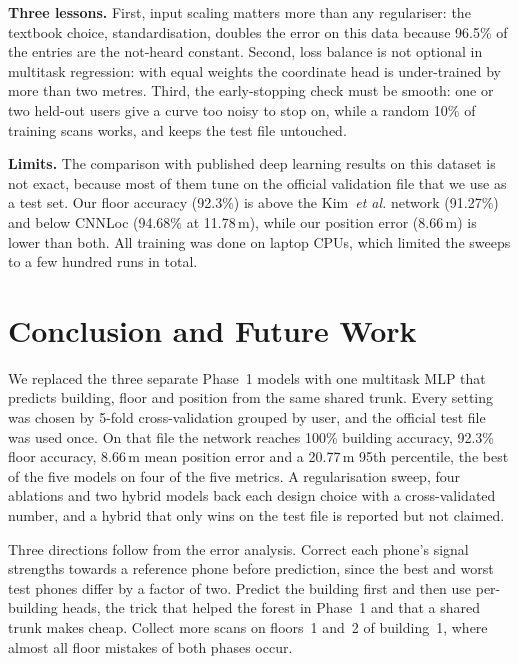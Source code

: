 \documentclass[conference]{IEEEtran}
\begin{document}
\textbf{Three lessons.} First, input scaling matters more than any regulariser: the textbook
choice, standardisation, doubles the error on this data because 96.5\% of the entries are the
not-heard constant. Second, loss balance is not optional in multitask regression: with equal
weights the coordinate head is under-trained by more than two metres. Third, the early-stopping
check must be smooth: one or two held-out users give a curve too noisy to stop on, while a random
10\% of training scans works, and keeps the test file untouched.

\textbf{Limits.} The comparison with published deep learning results on this dataset is not
exact, because most of them tune on the official validation file that we use as a test set. Our
floor accuracy (92.3\%) is above the Kim~\emph{et al.} network (91.27\%) and below CNNLoc
(94.68\% at 11.78\,m), while our position error (8.66\,m) is lower than both. All training was done
on laptop CPUs, which limited the sweeps to a few hundred runs in total.

\section{Conclusion and Future Work}

We replaced the three separate Phase~1 models with one multitask MLP that predicts building, floor
and position from the same shared trunk. Every setting was chosen by 5-fold cross-validation
grouped by user, and the official test file was used once. On that file the network reaches 100\%
building accuracy, 92.3\% floor accuracy, 8.66\,m mean position error and a 20.77\,m 95th
percentile, the best of the five models on four of the five metrics. A regularisation sweep,
four ablations and two hybrid models back each design choice with a cross-validated number, and
a hybrid that only wins on the test file is reported but not claimed.

Three directions follow from the error analysis. Correct each phone's signal strengths towards a
reference phone before prediction, since the best and worst test phones differ by a factor of two.
Predict the building first and then use per-building heads, the trick that helped the forest in
Phase~1 and that a shared trunk makes cheap. Collect more scans on floors~1 and~2 of building~1,
where almost all floor mistakes of both phases occur.
\end{document}
